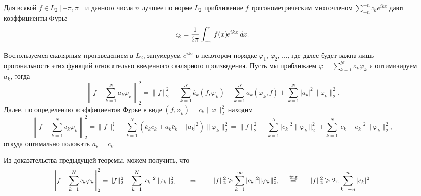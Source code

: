 

\begin{to_thr}
    Для всякой $f \in L_2[-\pi, \pi]$ и данного числа $n$ лучшее по норме $L_2$ приближение $f$ тригонометрическим многочленом $\sum_{-n}^{+n} c_k e^{ikx}$ дают коэффициенты Фурье
    \begin{equation*}
        c_k = \frac{1}{2\pi} \int_{-\pi}^{\pi} f(x) e^{ikx} \d x.
    \end{equation*}
\end{to_thr}

\begin{uproof}
    Воспользуемся скалярным произведением в $L_2$, занумеруем $e^{ikx}$ в некотором порядке $\varphi_1$, $\varphi_2$, $\ldots$, где далее будет важна лишь орогональность этих функций относительно введенного скалярного произведения. Пусть мы приближаем $\varphi = \sum_{k=1}^N a_k \varphi_k$ и оптимизируем $a_k$, тогда
    \begin{equation*}
        \left\|
            f - \sum_{k=1}^{N} a_k \varphi_k
        \right\|_2^2 = \|f\|_2^2 - 
        \sum_{k=1}^{N} \bar{a}_k (f, \varphi_k) - \sum_{k=1}^{N} a_k (\varphi_k, f) + \sum_{k=1}^{N} |a_k|^2 \|\varphi_k\|_2^2.
    \end{equation*}
    Далее, по определению коэффициентов Фурье в виде $(f, \varphi_k) = c_k \|\varphi\|_2^2$ находим
    \begin{equation*}
        \left\|
            f - \sum_{k=1}^{N} a_k \varphi_k
        \right\|_2^2 = \|f\|_2^2 - \sum_{k=1}^{N} \left(
            \bar{a}_k c_k + a_k \bar{c}_k - |a_k|^2
        \right) \|\varphi_k\|_2^2 = 
        \|f\|_2^2 - \sum_{k=1}^{N} |c_k|^2 \|\varphi_k\|_2^2 + \sum_{k=1}^{N} |c_k - a_k|^2 \|\varphi_k\|_2^2,
    \end{equation*}
    откуда оптимально положить $a_k = c_k$. 
\end{uproof}


\begin{to_lem}
    Из доказательства предыдущей теоремы, можем получить, что
    \begin{equation*}
        \left\|f - \sum_{k=1}^N c_k \varphi_k \right\|_2^2 = 
        \|f\|_2^2 - \sum_{k=1}^{N} |c_k|^2 \|\varphi_k\|_2^2,
        \hspace{0.7 cm} \Rightarrow \hspace{0.7   cm}
        \|f\|_2^2 \geq  \sum_{k=1}^{\infty} |c_k|^2 \|\varphi_k\|^2_2,
        \hspace{0.5cm} \overset{\mathrm{trig}}{\Rightarrow}  \hspace{0.5cm}
        \|f\|_2^2 \geq 2\pi \sum_{k=-n}^n |c_k|^2.
    \end{equation*}
\end{to_lem}

